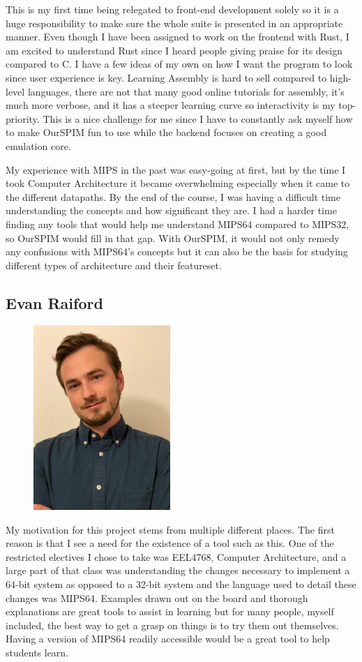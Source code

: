 \documentclass[parskip=half, fontsize=12pt]{scrartcl}
\begin{document}
This is my first time being relegated to front-end development solely so it is a huge responsibility to make sure the whole suite is presented in an appropriate manner. Even though I have been assigned to work on the frontend with Rust, I am excited to understand Rust since I heard people giving praise for its design compared to C. I have a few ideas of my own on how I want the program to look since user experience is key. Learning Assembly is hard to sell compared to high-level languages, there are not that many good online tutorials for assembly, it's much more verbose, and it has a steeper learning curve so interactivity is my top-priority. This is a nice challenge for me since I have to constantly ask myself how to make OurSPIM fun to use while the backend focuses on creating a good emulation core.

My experience with MIPS in the past was easy-going at first, but by the time I took Computer Architecture it became overwhelming especially when it came to the different datapaths. By the end of the course, I was having a difficult time understanding the concepts and how significant they are. I had a harder time finding any tools that would help me understand MIPS64 compared to MIPS32, so OurSPIM would fill in that gap. With OurSPIM, it would not only remedy any confusions with MIPS64's concepts but it can also be the basis for studying different types of architecture and their featureset.


\subsection{Evan Raiford}
\begin{figure}[H]
    \centering
    \includegraphics[height=7cm]{profile-evan}
\end{figure}

My motivation for this project stems from multiple different places. The first reason is that I see a need for the existence of a tool such as this. One of the restricted electives I chose to take was EEL4768, Computer Architecture, and a large part of that class was understanding the changes necessary to implement a 64-bit system as opposed to a 32-bit system and the language used to detail these changes was MIPS64. Examples drawn out on the board and thorough explanations are great tools to assist in learning but for many people, myself included, the best way to get a grasp on things is to try them out themselves. Having a version of MIPS64 readily accessible would be a great tool to help students learn.
\end{document}
